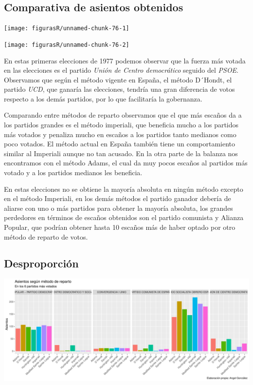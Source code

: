 \documentclass[12pt,a4paper,]{book}
\numberwithin{dummy}{section}
\theoremstyle{ocrenumbox}
\theoremstyle{blacknumex}
\theoremstyle{blacknumbox}
\theoremstyle{ocrenum}
\theoremstyle{ocrenum}
\begin{document}
\hypertarget{comparativa-de-asientos-obtenidos}{%
\subsection{Comparativa de asientos
obtenidos}\label{comparativa-de-asientos-obtenidos}}

\begin{center}\texttt{[image: figurasR/unnamed-chunk-76-1]} \end{center}

\begin{center}\texttt{[image: figurasR/unnamed-chunk-76-2]} \end{center}

En estas primeras elecciones de 1977 podemos observar que la fuerza más
votada en las elecciones es el partido \emph{Unión de Centro
democrático} seguido del \emph{PSOE}. Observamos que según el método
vigente en España, el método D´Hondt, el partido \emph{UCD}, que ganaría
las elecciones, tendría una gran diferencia de votos respecto a los
demás partidos, por lo que facilitaría la gobernanza.

Comparando entre métodos de reparto observamos que el que más escaños da
a los partidos grandes es el método imperiali, que beneficia mucho a los
partidos más votados y penaliza mucho en escaños a los partidos tanto
medianos como poco votados. El método actual en España también tiene un
comportamiento similar al Imperiali aunque no tan acusado. En la otra
parte de la balanza nos encontramos con el método Adams, el cual da muy
pocos escaños al partidos más votado y a los partidos medianos les
beneficia.

En estas elecciones no se obtiene la mayoría absoluta en ningún método
excepto en el método Imperiali, en los demás métodos el partido ganador
debería de aliarse con uno o más partidos para obtener la mayoría
absoluta, los grandes perdedores en términos de escaños obtenidos son el
partido comunista y Alianza Popular, que podrían obtener hasta 10
escaños más de haber optado por otro método de reparto de votos.

\hypertarget{desproporciuxf3n}{%
\subsection{Desproporción}\label{desproporciuxf3n}}

\begin{center}\includegraphics[width=1\linewidth]{figurasR/unnamed-chunk-77-1} \end{center}
\end{document}
